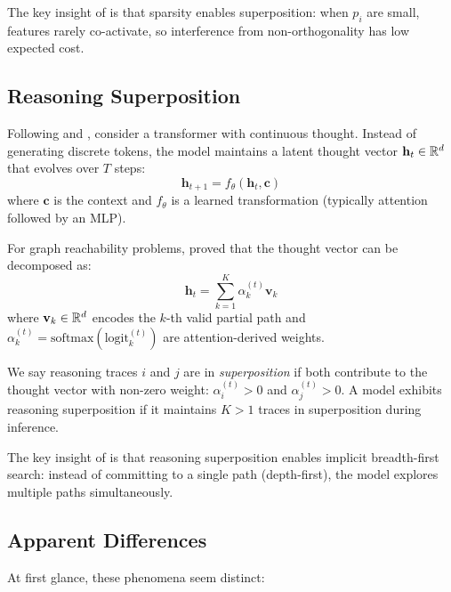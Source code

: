 The key insight of \citet{elhage2022toy} is that sparsity enables superposition: when $p_i$ are small, features rarely co-activate, so interference from non-orthogonality has low expected cost.

\subsection{Reasoning Superposition}
\label{sec:reason_superposition}

Following \citet{hao2024training} and \citet{zhu2025reasoning}, consider a transformer with continuous thought. Instead of generating discrete tokens, the model maintains a latent thought vector $\mathbf{h}_t \in \mathbb{R}^d$ that evolves over $T$ steps:
\begin{equation}
\mathbf{h}_{t+1} = f_\theta(\mathbf{h}_t, \mathbf{c})
\end{equation}
where $\mathbf{c}$ is the context and $f_\theta$ is a learned transformation (typically attention followed by an MLP).

For graph reachability problems, \citet{zhu2025reasoning} proved that the thought vector can be decomposed as:
\begin{equation}
\mathbf{h}_t = \sum_{k=1}^K \alpha_k^{(t)} \mathbf{v}_k
\label{eq:thought_decomp}
\end{equation}
where $\mathbf{v}_k \in \mathbb{R}^d$ encodes the $k$-th valid partial path and $\alpha_k^{(t)} = \text{softmax}(\text{logit}_k^{(t)})$ are attention-derived weights.

\begin{definition}
\label{def:reason_super}
We say reasoning traces $i$ and $j$ are in \emph{superposition} if both contribute to the thought vector with non-zero weight: $\alpha_i^{(t)} > 0$ and $\alpha_j^{(t)} > 0$. A model exhibits reasoning superposition if it maintains $K > 1$ traces in superposition during inference.
\end{definition}

The key insight of \citet{zhu2025reasoning} is that reasoning superposition enables implicit breadth-first search: instead of committing to a single path (depth-first), the model explores multiple paths simultaneously.

\subsection{Apparent Differences}

At first glance, these phenomena seem distinct:

